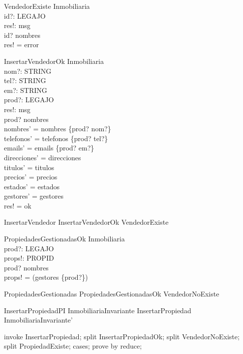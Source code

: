 \begin{schema}{VendedorExiste}
\Xi Inmobiliaria \\
id?: LEGAJO \\
res!: msg \\
\where
id? \in \dom nombres \\
res! = error \\
\end{schema}

\begin{schema}{InsertarVendedorOk}
\Delta Inmobiliaria \\
nom?: STRING \\
tel?: STRING \\
em?: STRING \\
prod?: LEGAJO \\
res!: msg \\
\where
prod? \notin \dom nombres \\

nombres' =  nombres \cup \{prod? \mapsto nom?\}  \\
telefonos' =  telefonos \cup \{prod? \mapsto tel?\}  \\
emails' =  emails \cup \{prod? \mapsto em?\}  \\

direcciones' =  direcciones\\
titulos' = titulos\\
precios' = precios\\
estados' = estados\\
gestores' = gestores\\

res! = ok \\
\end{schema}

\begin{zed}
InsertarVendedor  InsertarVendedorOk \lor VendedorExiste
\end{zed}

\begin{schema}{PropiedadesGestionadasOk}
\Xi Inmobiliaria \\
prod?: LEGAJO \\
props!: \power PROPID \\
\where
prod? \in \dom nombres \\
props! = \dom(gestores \rres \{prod?\})
\end{schema}

\begin{zed}
PropiedadesGestionadas  PropiedadesGestionadasOk \lor VendedorNoExiste
\end{zed}

\begin{theorem}{InsertarPropiedadPI}
InmobiliariaInvariante \land InsertarPropiedad \implies InmobiliariaInvariante'
\end{theorem}

\begin{zproof}[InsertarPropiedadPI]
invoke InsertarPropiedad;
split InsertarPropiedadOk;
split VendedorNoExiste;
split PropiedadExiste;
cases;
prove by reduce;
\end{zproof}